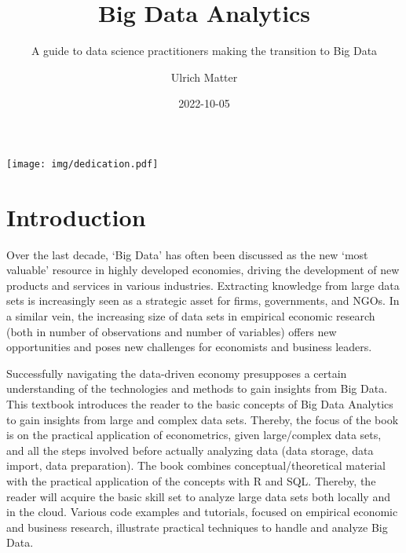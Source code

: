 \documentclass[
  12pt,
]{style/krantz}
\title{Big Data Analytics}
\subtitle{A guide to data science practitioners making the transition to Big Data}
\author{Ulrich Matter}
\date{2022-10-05}
\begin{document}
\maketitle



\thispagestyle{empty}

\begin{center}
\texttt{[image: img/dedication.pdf]}
\end{center}

\setlength{\abovedisplayskip}{-5pt}
\setlength{\abovedisplayshortskip}{-5pt}

{
\hypersetup{linkcolor=}
\setcounter{tocdepth}{2}
\tableofcontents
}
\listoffigures
\listoftables
\mainmatter

\hypertarget{introduction}{%
\chapter{Introduction}\label{introduction}}

Over the last decade, `Big Data' has often been discussed as the new `most valuable'
resource in highly developed economies, driving the development of new products and services in various industries. Extracting knowledge from large data sets is increasingly seen as a strategic asset for firms, governments, and NGOs. In a similar vein, the increasing size of data sets in empirical economic research (both in number of observations and number of variables) offers new opportunities and poses new challenges for economists and business leaders.

Successfully navigating the data-driven economy presupposes a certain understanding of the technologies and methods to gain insights from Big Data. This textbook introduces the reader to the basic concepts of Big Data Analytics to gain insights from large and complex data sets. Thereby, the focus of the book is on the practical application of econometrics, given large/complex data sets, and all the steps involved before actually analyzing data (data storage, data import, data preparation). The book combines conceptual/theoretical material with the practical application of the concepts with R and SQL. Thereby, the reader will acquire the basic skill set to analyze large data sets both locally and in the cloud. Various code examples and tutorials, focused on empirical economic and business research, illustrate practical techniques to handle and analyze Big Data.
\end{document}
